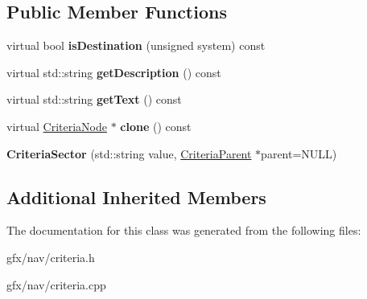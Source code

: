 \subsection*{Public Member Functions}
\begin{DoxyCompactItemize}
\item 
virtual bool {\bfseries is\+Destination} (unsigned system) const \hypertarget{classCriteriaSector_a14133c95eac54255563abb42c1df3e7b}{}\label{classCriteriaSector_a14133c95eac54255563abb42c1df3e7b}

\item 
virtual std\+::string {\bfseries get\+Description} () const \hypertarget{classCriteriaSector_a1ddced6e9baf23e768189bfb8ff7ca75}{}\label{classCriteriaSector_a1ddced6e9baf23e768189bfb8ff7ca75}

\item 
virtual std\+::string {\bfseries get\+Text} () const \hypertarget{classCriteriaSector_a60148514f57e1afa8595610473eaf656}{}\label{classCriteriaSector_a60148514f57e1afa8595610473eaf656}

\item 
virtual \hyperlink{classCriteriaNode}{Criteria\+Node} $\ast$ {\bfseries clone} () const \hypertarget{classCriteriaSector_a018cc196d2a0c3e3e35ba2d574d2dad3}{}\label{classCriteriaSector_a018cc196d2a0c3e3e35ba2d574d2dad3}

\item 
{\bfseries Criteria\+Sector} (std\+::string value, \hyperlink{classCriteriaParent}{Criteria\+Parent} $\ast$parent=N\+U\+LL)\hypertarget{classCriteriaSector_a72e4fb945c881dd5be5d068e671565ee}{}\label{classCriteriaSector_a72e4fb945c881dd5be5d068e671565ee}

\end{DoxyCompactItemize}
\subsection*{Additional Inherited Members}


The documentation for this class was generated from the following files\+:\begin{DoxyCompactItemize}
\item 
gfx/nav/criteria.\+h\item 
gfx/nav/criteria.\+cpp\end{DoxyCompactItemize}
